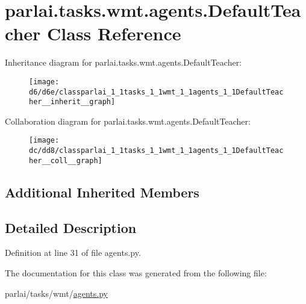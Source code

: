 \hypertarget{classparlai_1_1tasks_1_1wmt_1_1agents_1_1DefaultTeacher}{}\section{parlai.\+tasks.\+wmt.\+agents.\+Default\+Teacher Class Reference}
\label{classparlai_1_1tasks_1_1wmt_1_1agents_1_1DefaultTeacher}


Inheritance diagram for parlai.\+tasks.\+wmt.\+agents.\+Default\+Teacher\+:\nopagebreak
\begin{figure}[H]
\begin{center}
\leavevmode
\texttt{[image: d6/d6e/classparlai\_1\_1tasks\_1\_1wmt\_1\_1agents\_1\_1DefaultTeacher\_\_inherit\_\_graph]}
\end{center}
\end{figure}


Collaboration diagram for parlai.\+tasks.\+wmt.\+agents.\+Default\+Teacher\+:\nopagebreak
\begin{figure}[H]
\begin{center}
\leavevmode
\texttt{[image: dc/dd8/classparlai\_1\_1tasks\_1\_1wmt\_1\_1agents\_1\_1DefaultTeacher\_\_coll\_\_graph]}
\end{center}
\end{figure}
\subsection*{Additional Inherited Members}


\subsection{Detailed Description}


Definition at line 31 of file agents.\+py.



The documentation for this class was generated from the following file\+:\begin{DoxyCompactItemize}
\item 
parlai/tasks/wmt/\hyperlink{parlai_2tasks_2wmt_2agents_8py}{agents.\+py}\end{DoxyCompactItemize}
